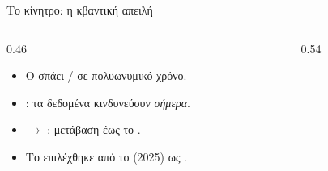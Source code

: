 \begin{frame}{Το κίνητρο: η κβαντική απειλή}
  \begin{columns}[T]
    \begin{column}{0.46\textwidth}
      \begin{itemize}
        \item Ο  σπάει / σε πολυωνυμικό χρόνο.
        \item {}: τα δεδομένα κινδυνεύουν \emph{σήμερα}.
        \item {} $\rightarrow$ : μετάβαση έως το .
        \item Το \HQC επιλέχθηκε από το  (2025) ως .
      \end{itemize}
    \end{column}
    \begin{column}{0.54\textwidth}
      \resizebox{\linewidth}{!}{}
    \end{column}
  \end{columns}
\end{frame}
